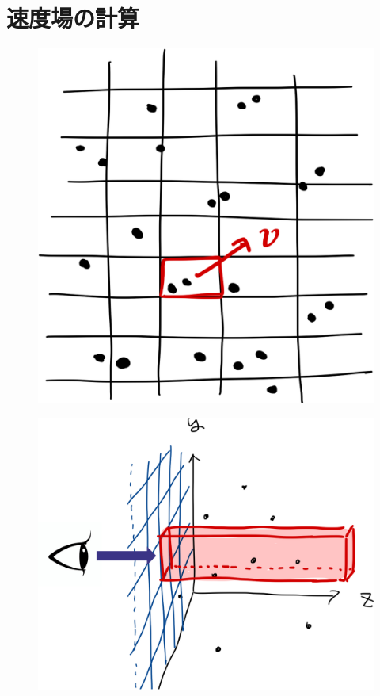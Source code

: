 \section{速度場の計算}

\begin{figure}
	\centering
	
	\begin{minipage}[b]{0.33\linewidth}
		\centering
		\includegraphics[width=\linewidth]{./pic/outflow_ex4.png}
		\subcaption{}
		\label{}
	\end{minipage}
	\begin{minipage}[b]{0.45\linewidth}
		\centering
		\includegraphics[width=\linewidth]{./pic/outflow_ex5.png}
		\subcaption{}
		\label{}
	\end{minipage}
	
	\caption{}
	\label{}
\end{figure}